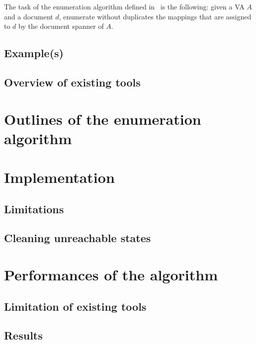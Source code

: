 \documentclass[12px]{article}
\begin{document}
        The task of the enumeration algorithm defined in~\cite{ICDT19} is the
        following: given a VA $A$ and a document $d$, enumerate without
        duplicates the mappings that are assigned to $d$ by the document
        spanner of $A$.

    \subsection{Example(s)}

    \subsection{Overview of existing tools}


  \section{Outlines of the enumeration algorithm}


  \section{Implementation}


    \subsection{Limitations}

    \subsection{Cleaning unreachable states}


  \section{Performances of the algorithm}

    \subsection{Limitation of existing tools}

    \subsection{Results}


  \pagebreak
  
  
\end{document}
